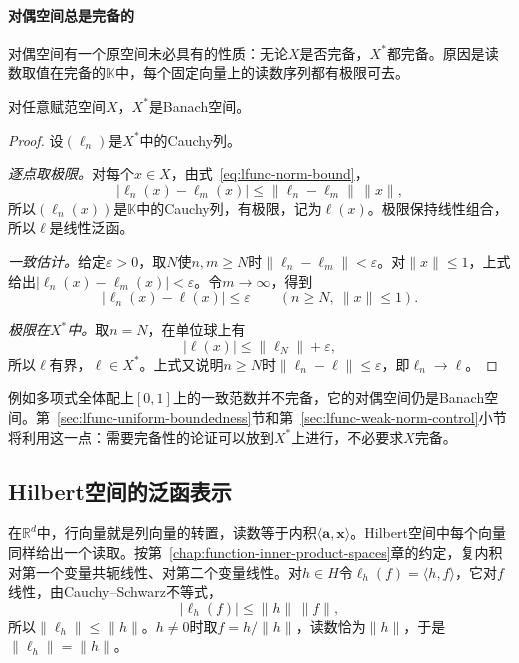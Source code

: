 \paragraph{对偶空间总是完备的}
对偶空间有一个原空间未必具有的性质：无论$X$是否完备，$X^*$都完备。原因是读数取值在完备的$\mathbb K$中，每个固定向量上的读数序列都有极限可去。

\begin{theorem}[对偶空间的完备性]
\label{thm:lfunc-dual-complete}
对任意赋范空间$X$，$X^*$是Banach空间。
\end{theorem}

\begin{proof}
设$(\ell_n)$是$X^*$中的Cauchy列。

\emph{逐点取极限。}对每个$x\in X$，由式~\eqref{eq:lfunc-norm-bound}，
\[
\lvert\ell_n(x)-\ell_m(x)\rvert\leq\lVert\ell_n-\ell_m\rVert\,\lVert x\rVert ,
\]
所以$(\ell_n(x))$是$\mathbb K$中的Cauchy列，有极限，记为$\ell(x)$。极限保持线性组合，所以$\ell$是线性泛函。

\emph{一致估计。}给定$\varepsilon>0$，取$N$使$n,m\geq N$时$\lVert\ell_n-\ell_m\rVert<\varepsilon$。对$\lVert x\rVert\leq1$，上式给出$\lvert\ell_n(x)-\ell_m(x)\rvert<\varepsilon$。令$m\to\infty$，得到
\[
\lvert\ell_n(x)-\ell(x)\rvert\leq\varepsilon\qquad(n\geq N,\ \lVert x\rVert\leq1).
\]

\emph{极限在$X^*$中。}取$n=N$，在单位球上有
\[
\lvert\ell(x)\rvert\leq\lVert\ell_N\rVert+\varepsilon ,
\]
所以$\ell$有界，$\ell\in X^*$。上式又说明$n\geq N$时$\lVert\ell_n-\ell\rVert\leq\varepsilon$，即$\ell_n\to\ell$。
\end{proof}

例如多项式全体配上$[0,1]$上的一致范数并不完备，它的对偶空间仍是Banach空间。第~\ref{sec:lfunc-uniform-boundedness}节和第~\ref{sec:lfunc-weak-norm-control}小节将利用这一点：需要完备性的论证可以放到$X^*$上进行，不必要求$X$完备。

\subsection{Hilbert空间的泛函表示}
\label{sec:lfunc-riesz}

在$\mathbb R^d$中，行向量就是列向量的转置，读数等于内积$\langle\bm a,\bm x\rangle$。Hilbert空间中每个向量同样给出一个读取。按第~\ref{chap:function-inner-product-spaces}章的约定，复内积对第一个变量共轭线性、对第二个变量线性。对$h\in H$令$\ell_h(f)=\langle h,f\rangle$，它对$f$线性，由Cauchy--Schwarz不等式，
\[
\lvert\ell_h(f)\rvert\leq\lVert h\rVert\,\lVert f\rVert ,
\]
所以$\lVert\ell_h\rVert\leq\lVert h\rVert$。$h\neq0$时取$f=h/\lVert h\rVert$，读数恰为$\lVert h\rVert$，于是$\lVert\ell_h\rVert=\lVert h\rVert$。

